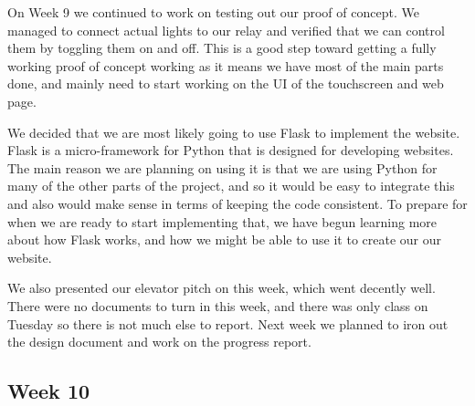 \documentclass[letterpaper,10pt]{article}
\begin{document}
On Week 9 we continued to work on testing out our proof of concept. We managed to connect actual lights to our relay and verified that we can control them by toggling them on and off. This is a good step toward getting a fully working proof of concept working as it means we have most of the main parts done, and mainly need to start working on the UI of the touchscreen and web page.

We decided that we are most likely going to use Flask to implement the website. Flask is a micro-framework for Python that is designed for developing websites. The main reason we are planning on using it is that we are using Python for many of the other parts of the project, and so it would be easy to integrate this and also would make sense in terms of keeping the code consistent. To prepare for when we are ready to start implementing that, we have begun learning more about how Flask works, and how we might be able to use it to create our our website.

We also presented our elevator pitch on this week, which went decently well. There were no documents to turn in this week, and there was only class on Tuesday so there is not much else to report. Next week we planned to iron out the design document and work on the progress report. 

\subsection{Week 10}
\end{document}
